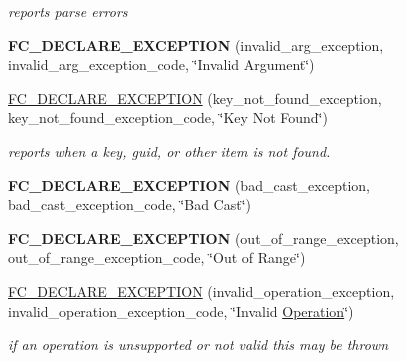 \begin{DoxyCompactItemize}
\begin{DoxyCompactList}\small\item\em report\textquotesingle{}s parse errors \end{DoxyCompactList}\item 
\mbox{\label{namespacefc_ae299263990879af936f6ca91f4475923}} 
{\bfseries F\+C\+\_\+\+D\+E\+C\+L\+A\+R\+E\+\_\+\+E\+X\+C\+E\+P\+T\+I\+ON} (invalid\+\_\+arg\+\_\+exception, invalid\+\_\+arg\+\_\+exception\+\_\+code, \char`\"{}Invalid Argument\char`\"{})
\item 
\mbox{\label{namespacefc_a7ca98604862f52a50ebfff0612babfe5}} 
\mbox{\hyperlink{namespacefc_a7ca98604862f52a50ebfff0612babfe5}{F\+C\+\_\+\+D\+E\+C\+L\+A\+R\+E\+\_\+\+E\+X\+C\+E\+P\+T\+I\+ON}} (key\+\_\+not\+\_\+found\+\_\+exception, key\+\_\+not\+\_\+found\+\_\+exception\+\_\+code, \char`\"{}Key Not Found\char`\"{})
\begin{DoxyCompactList}\small\item\em reports when a key, guid, or other item is not found. \end{DoxyCompactList}\item 
\mbox{\label{namespacefc_a02558ca2db8e32113bc1af4914624b25}} 
{\bfseries F\+C\+\_\+\+D\+E\+C\+L\+A\+R\+E\+\_\+\+E\+X\+C\+E\+P\+T\+I\+ON} (bad\+\_\+cast\+\_\+exception, bad\+\_\+cast\+\_\+exception\+\_\+code, \char`\"{}Bad Cast\char`\"{})
\item 
\mbox{\label{namespacefc_a593ff1e144fe027ebc780b9b334112c2}} 
{\bfseries F\+C\+\_\+\+D\+E\+C\+L\+A\+R\+E\+\_\+\+E\+X\+C\+E\+P\+T\+I\+ON} (out\+\_\+of\+\_\+range\+\_\+exception, out\+\_\+of\+\_\+range\+\_\+exception\+\_\+code, \char`\"{}Out of Range\char`\"{})
\item 
\mbox{\label{namespacefc_ac9067889b0fa0539d1ccfcb908f56929}} 
\mbox{\hyperlink{namespacefc_ac9067889b0fa0539d1ccfcb908f56929}{F\+C\+\_\+\+D\+E\+C\+L\+A\+R\+E\+\_\+\+E\+X\+C\+E\+P\+T\+I\+ON}} (invalid\+\_\+operation\+\_\+exception, invalid\+\_\+operation\+\_\+exception\+\_\+code, \char`\"{}Invalid \mbox{\hyperlink{struct_operation}{Operation}}\char`\"{})
\begin{DoxyCompactList}\small\item\em if an operation is unsupported or not valid this may be thrown \end{DoxyCompactList}\item 

\end{DoxyCompactItemize}
